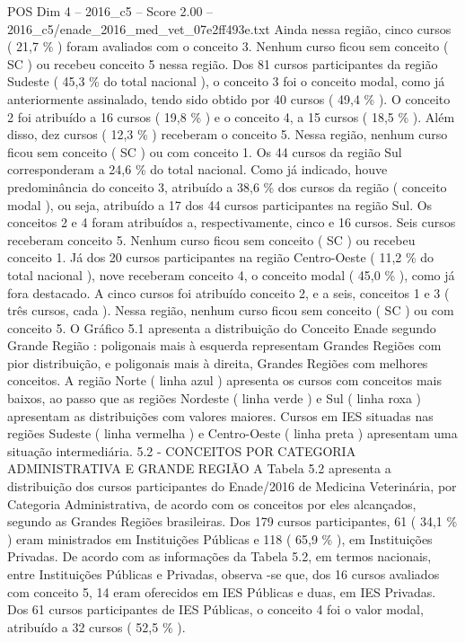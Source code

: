 \begin{textsample}{POS Dim 4 – 2016\_c5 – Score 2.00 – 2016\_c5/enade\_2016\_med\_vet\_07e2ff493e.txt}
Ainda nessa região, cinco cursos ( 21,7 \% ) foram avaliados com o conceito 3.
Nenhum curso ficou sem conceito ( SC ) ou recebeu conceito 5 nessa região.
Dos 81 cursos participantes da região Sudeste ( 45,3 \% do total nacional ), o conceito 3 foi o conceito modal, como já anteriormente assinalado, tendo sido obtido por 40 cursos ( 49,4 \% ).
O conceito 2 foi atribuído a 16 cursos ( 19,8 \% ) e o conceito 4, a 15 cursos ( 18,5 \% ).
Além disso, dez cursos ( 12,3 \% ) receberam o conceito 5.
Nessa região, nenhum curso ficou sem conceito ( SC ) ou com conceito 1.
Os 44 cursos da região Sul corresponderam a 24,6 \% do total nacional.
Como já indicado, houve predominância do conceito 3, atribuído a 38,6 \% dos cursos da região ( conceito modal ), ou seja, atribuído a 17 dos 44 cursos participantes na região Sul.
Os conceitos 2 e 4 foram atribuídos a, respectivamente, cinco e 16 cursos.
Seis cursos receberam conceito 5.
Nenhum curso ficou sem conceito ( SC ) ou recebeu conceito 1.
Já dos 20 cursos participantes na região Centro-Oeste ( 11,2 \% do total nacional ), nove receberam conceito 4, o conceito modal ( 45,0 \% ), como já fora destacado.
A cinco cursos foi atribuído conceito 2, e a seis, conceitos 1 e 3 ( três cursos, cada ).
Nessa região, nenhum curso ficou sem conceito ( SC ) ou com conceito 5.
O Gráfico 5.1 apresenta a distribuição do Conceito Enade segundo Grande Região : poligonais mais à esquerda representam Grandes Regiões com pior distribuição, e poligonais mais à direita, Grandes Regiões com melhores conceitos.
A região Norte ( linha azul ) apresenta os cursos com conceitos mais baixos, ao passo que as regiões Nordeste ( linha verde ) e Sul ( linha roxa ) apresentam as distribuições com valores maiores.
Cursos em IES situadas nas regiões Sudeste ( linha vermelha ) e Centro-Oeste ( linha preta ) apresentam uma situação intermediária. 5.2 - CONCEITOS POR CATEGORIA ADMINISTRATIVA E GRANDE REGIÃO A Tabela 5.2 apresenta a distribuição dos cursos participantes do Enade/2016 de Medicina Veterinária, por Categoria Administrativa, de acordo com os conceitos por eles alcançados, segundo as Grandes Regiões brasileiras.
Dos 179 cursos participantes, 61 ( 34,1 \% ) eram ministrados em Instituições Públicas e 118 ( 65,9 \% ), em Instituições Privadas.
De acordo com as informações da Tabela 5.2, em termos nacionais, entre Instituições Públicas e Privadas, observa -se que, dos 16 cursos avaliados com conceito 5, 14 eram oferecidos em IES Públicas e duas, em IES Privadas.
Dos 61 cursos participantes de IES Públicas, o conceito 4 foi o valor modal, atribuído a 32 cursos ( 52,5 \% ).

\end{textsample}
